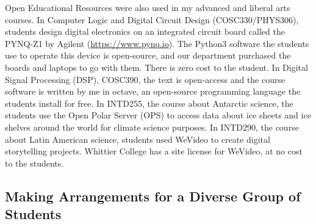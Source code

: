 \documentclass[../../../main.tex]{subfiles}
\begin{document}
Open Educational Resources were also used in my advanced and liberal arts courses.  In Computer Logic and Digital Circuit Design (COSC330/PHYS306), students design digital electronics on an integrated circuit board called the PYNQ-Z1 by Agilent (\url{https://www.pynq.io}).  The Python3 software the students use to operate this device is open-source, and our department purchased the boards and laptops to go with them.  There is zero cost to the student.  In Digital Signal Processing (DSP), COSC390, the text is open-access and the course software is written by me in octave, an open-source programming language the students install for free.  In INTD255, the course about Antarctic science, the students use the Open Polar Server (OPS) to access data about ice sheets and ice shelves around the world for climate science purposes.  In INTD290, the course about Latin American science, students used WeVideo to create digital storytelling projects.  Whittier College has a site license for WeVideo, at no cost to the students.

\subsection{Making Arrangements for a Diverse Group of Students}
\label{sec:arrange}
\end{document}
